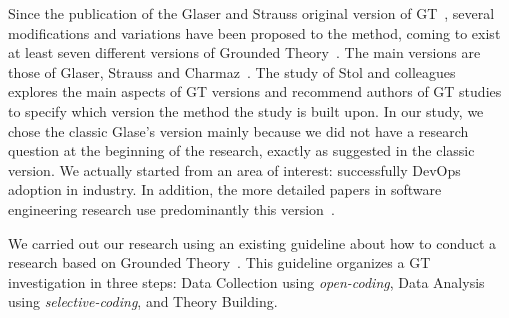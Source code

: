 Since the publication of the Glaser and Strauss original version of GT~\cite{glase1967discovery},
several modifications and variations have been proposed to the method, coming to
exist at least seven different versions of Grounded Theory~\cite{denzin2007grounded}.
The main versions are those of Glaser, Strauss and
Charmaz~\cite{stol2016grounded}. The study of Stol and colleagues~\cite{stol2016grounded}
explores the main aspects of GT versions and recommend authors of GT studies to
specify which version the method the study is built upon. In our study, we chose the classic
Glase's version mainly because we did not have a research
question at the beginning of the research, exactly as suggested in the classic
version. We actually started from an area of interest: successfully DevOps adoption
in industry. In addition, the more detailed papers in
software engineering research use predominantly this version~\cite{stol2016grounded}.





We carried out our research using an existing 
guideline about how to conduct a research based on 
Grounded Theory~\cite{adolph2011using}. This guideline organizes 
a GT investigation in three steps: Data Collection using \emph{open-coding},  
Data Analysis using \emph{selective-coding}, and Theory Building. 
 


